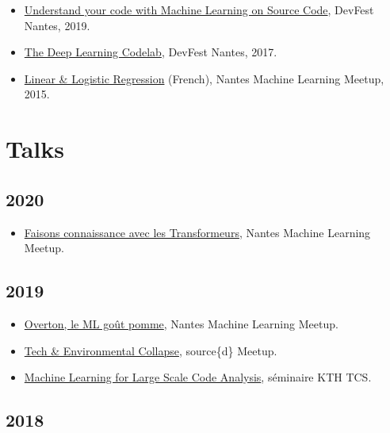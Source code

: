 \documentclass[11pt,a4paper]{moderncv}
\begin{document}
\begin{itemize}
\item \href{https://github.com/m09/deeplearning-codelab}{Understand
    your code with Machine Learning on Source Code}, DevFest Nantes,
  2019.
\item \href{https://github.com/m09/deeplearning-codelab}{The Deep
    Learning Codelab}, DevFest Nantes, 2017.
\item
  \href{https://github.com/nantes-machine-learning-meetup/NMLM/tree/master/2015-10-05__r\%C3\%A9gression-lin\%C3\%A9aire-logistique}{
    Linear \& Logistic Regression} (French), Nantes Machine
  Learning Meetup, 2015.
\end{itemize}

\section{Talks}

\subsection{2020}
\begin{itemize}
  \item
  \href{https://www.meetup.com/Nantes-Machine-Learning-Meetup/events/268243136/}{Faisons connaissance avec les Transformeurs}, Nantes Machine Learning Meetup.
\end{itemize}

\subsection{2019}

\begin{itemize}
\item
  \href{https://www.meetup.com/Nantes-Machine-Learning-Meetup/events/265265431/}{Overton, le ML goût pomme}, Nantes Machine Learning Meetup.
\item
  \href{https://www.eventbrite.com/e/tech-environmental-collapse-tickets-57986002695}{Tech
    \& Environmental Collapse}, source\{d\} Meetup.
\item \href{https://github.com/m09/talks/tree/master/kth}{Machine
    Learning for Large Scale Code Analysis}, séminaire KTH TCS.
\end{itemize}

\subsection{2018}
\end{document}
